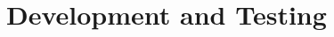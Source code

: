 \documentclass[write-up.tex]{subfiles}
\begin{document}
\section{Development and Testing}
 
\end{document}
